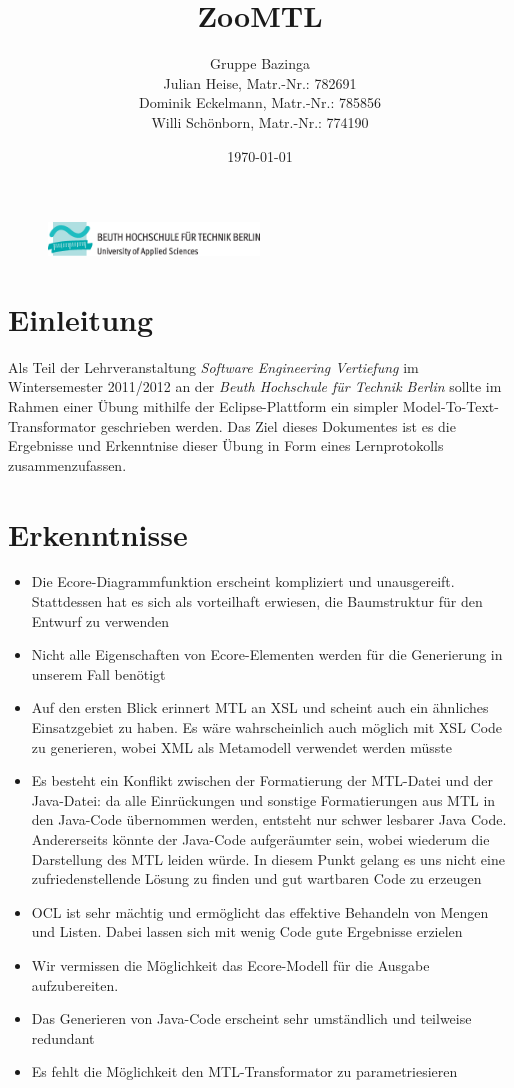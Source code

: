 \documentclass[a4paper]{article}
\title{ZooMTL}
\author{Gruppe Bazinga \\ Julian Heise, Matr.-Nr.: 782691 \\ Dominik Eckelmann, Matr.-Nr.: 785856 \\ Willi Schönborn, Matr.-Nr.: 774190}
\date{\today}
\begin{document}
\begin{figure}[H]
\centering
\includegraphics[width=0.5\textwidth]{beuth.eps}
\maketitle
\end{figure}

\section{Einleitung}
Als Teil der Lehrveranstaltung \textit{Software Engineering Vertiefung} im Wintersemester 2011/2012 an der \textit{Beuth Hochschule für Technik Berlin} sollte im Rahmen einer Übung mithilfe der Eclipse-Plattform ein simpler Model-To-Text-Transformator geschrieben werden. Das Ziel dieses Dokumentes ist es die Ergebnisse und Erkenntnise dieser Übung in Form eines Lernprotokolls zusammenzufassen.

\section{Erkenntnisse}
\begin{itemize}
  \item Die Ecore-Diagrammfunktion erscheint kompliziert und unausgereift. Stattdessen hat es sich als vorteilhaft erwiesen, die Baumstruktur für den Entwurf zu verwenden
  \item Nicht alle Eigenschaften von Ecore-Elementen werden für die Generierung in unserem Fall benötigt
  \item Auf den ersten Blick erinnert MTL an XSL und scheint auch ein ähnliches Einsatzgebiet zu haben. Es wäre wahrscheinlich auch möglich mit XSL Code zu generieren, wobei XML als Metamodell verwendet werden müsste
  \item Es besteht ein Konflikt zwischen der Formatierung der MTL-Datei und der Java-Datei: da alle Einrückungen und sonstige Formatierungen aus MTL in den Java-Code übernommen werden, entsteht nur schwer lesbarer Java Code. Andererseits könnte der Java-Code aufgeräumter sein, wobei wiederum die Darstellung des MTL leiden würde. In diesem Punkt gelang es uns nicht eine zufriedenstellende Lösung zu finden und gut wartbaren Code zu erzeugen
  \item OCL ist sehr mächtig und ermöglicht das effektive Behandeln von Mengen und Listen. Dabei lassen sich mit wenig Code gute Ergebnisse erzielen
  \item Wir vermissen die Möglichkeit das Ecore-Modell für die Ausgabe aufzubereiten. 
  \item Das Generieren von Java-Code erscheint sehr umständlich und teilweise redundant
  \item Es fehlt die Möglichkeit den MTL-Transformator zu parametriesieren
\end{itemize}
\end{document}
